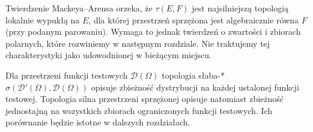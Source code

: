\begin{uwaga}
Twierdzenie Mackeya--Arensa orzeka, że $\tau(E,F)$ jest
najsilniejszą topologią lokalnie wypukłą na $E$, dla której
przestrzeń sprzężona jest algebraicznie równa $F$
(przy podanym parowaniu). Wymaga to jednak twierdzeń
o zwartości i zbiorach polarnych, które rozwiniemy w następnym
rozdziale. Nie traktujemy tej charakterystyki jako
udowodnionej w bieżącym miejscu.
\end{uwaga}

\begin{uwaga}
Dla przestrzeni funkcji testowych $\mathcal D(\Omega)$
topologia słaba-* $\sigma(\mathcal D'(\Omega),\mathcal D(\Omega))$
opisuje zbieżność dystrybucji na każdej ustalonej funkcji
testowej. Topologia silna przestrzeni sprzężonej opisuje
natomiast zbieżność jednostajną na wszystkich zbiorach
ograniczonych funkcji testowych. Ich porównanie będzie
istotne w dalszych rozdziałach.
\end{uwaga}
